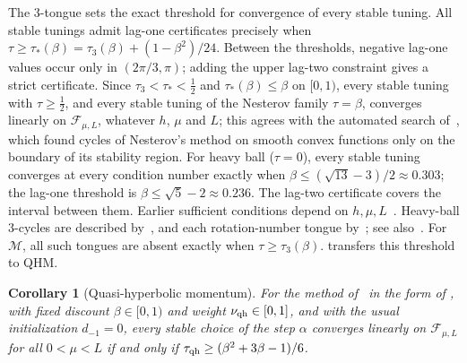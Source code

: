\documentclass[11pt]{article}
\newtheorem{corollary}[theorem]{Corollary}
\theoremstyle{definition}
\theoremstyle{remark}
\newcommand{\cF}{\mathcal F}
\newcommand{\cM}{\mathcal M}
\begin{document}
The \(3\)-tongue sets the exact threshold for convergence of every stable tuning.
All stable tunings admit lag-one certificates precisely when
\(\tau\ge\tau_*(\beta)=\tau_3(\beta)+(1-\beta^2)/24\).
Between the thresholds, negative lag-one values occur only in \((2\pi/3,\pi)\);
adding the upper lag-two constraint gives a strict certificate.
Since \(\tau_3<\tau_*<\frac12\) and \(\tau_*(\beta)\le\beta\) on \([0,1)\), every stable
tuning with \(\tau\ge\frac12\), and every stable tuning of the Nesterov family
\(\tau=\beta\), converges linearly on \(\cF_{\mu,L}\), whatever \(h\), \(\mu\) and \(L\); this agrees with the automated
search of~\cite{GDT23}, which found cycles of Nesterov's method on smooth convex functions only on the
boundary of its stability region.
For heavy ball (\(\tau=0\)), every stable tuning converges at every condition
number exactly when \(\beta\le(\sqrt{13}-3)/2\approx0.303\); the lag-one threshold is
\(\beta\le\sqrt5-2\approx0.236\).  The lag-two certificate covers the interval between them.
Earlier sufficient conditions depend on \(h,\mu,L\)~\cite{GFJ15}.
Heavy-ball \(3\)-cycles are described by~\cite[Theorem~3.5]{GTD}, and each rotation-number tongue
by~\cite[Corollary~D.11(b)]{TA}; see also~\cite{GDT23}.
For \(\cM\), all such tongues are absent exactly when \(\tau\ge\tau_3(\beta)\).
 transfers this threshold to QHM.

\begin{corollary}[Quasi-hyperbolic momentum]\label{cor:QHM}
For the method of~\cite{MY19} in the form of , with fixed discount \(\beta\in[0,1)\) and weight
\(\nu_{\rm qh}\in[0,1]\), and with the usual initialization \(d_{-1}=0\), every stable choice of the step \(\alpha\) converges linearly on
\(\cF_{\mu,L}\) for all \(0<\mu<L\) if and only if \(\tau_{\rm qh}\ge(\beta^2+3\beta-1)/6\).
\end{corollary}
\end{document}
